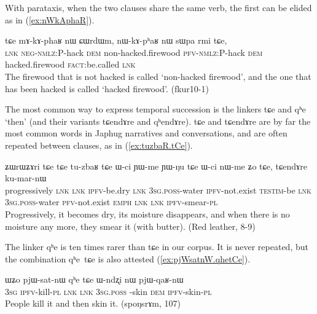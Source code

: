 \documentclass[oldfontcommands,oneside,a4paper,11pt]{article}
\newcommand{\ipa}[1]{{\phon \mbox{#1}}} %
\newcommand{\refb}[1]{(\ref{#1})}
\begin{document}
With parataxis, when the two clauses share the same verb, the first can be elided as in \refb{ex:nWkAphaR}.

\begin{exe}
\ex \label{ex:nWkAphaR}
\gll 
\ipa{tɕe}  	\ipa{mɤ-kɤ-phaʁ}  	\ipa{nɯ}  	\ipa{ɕɯrdɯm,}  	\ipa{nɯ-kɤ-pʰaʁ}  	\ipa{nɯ}  	\ipa{sɯpa}  	\ipa{rmi}  	\ipa{tɕe,}  	\\
\textsc{lnk} \textsc{neg-nmlz:}P-hack \textsc{dem} non-hacked.firewood \textsc{pfv-nmlz:}P-hack \textsc{dem} hacked.firewood \textsc{fact}:be.called \textsc{lnk} \\
\glt The firewood that is not hacked is called `non-hacked firewood', and the one that has been hacked is called `hacked firewood'. (fkur10-1)
\end{exe}

The most common way to express temporal succession is the linkers \ipa{tɕe} and \ipa{qʰe} `then' (and their variants \ipa{tɕendɤre} and \ipa{qʰendɤre}). \ipa{tɕe}   and \ipa{tɕendɤre} are by far the most common words in Japhug narratives and conversations, and are often repeated between clauses, as in \refb{ex:tuzbaR.tCe}. 

\begin{exe}
\ex \label{ex:tuzbaR.tCe}
\gll 
\ipa{ʑɯrɯʑɤri}  	\ipa{tɕe}  	\ipa{tɕe}  	\ipa{tu-zbaʁ}  	\ipa{tɕe}  	\ipa{ɯ-ci}  	\ipa{ɲɯ-me}  	\ipa{ɲɯ-ŋu}  	\ipa{tɕe}  	\ipa{ɯ-ci}  	\ipa{nɯ-me}  	\ipa{ʑo}  	\ipa{tɕe,}  	\ipa{tɕendɤre}  	\ipa{ku-mar-nɯ}  \\
progressively \textsc{lnk}  \textsc{lnk} \textsc{ipfv}-be.dry   \textsc{lnk}  \textsc{3sg.poss}-water \textsc{ipfv}-not.exist \textsc{testim}-be \textsc{lnk} \textsc{3sg.poss}-water \textsc{pfv}-not.exist \textsc{emph} \textsc{lnk}  \textsc{lnk} \textsc{ipfv}-smear-\textsc{pl} \\
\glt Progressively, it becomes dry, its moisture  disappears, and when there is no moisture any more, they smear it (with butter). (Red leather, 8-9)
\end{exe}

The linker \ipa{qʰe} is ten times rarer than \ipa{tɕe} in our corpus. It is  never repeated, but the combination \ipa{qʰe tɕe} is also attested \refb{ex:pjWsatnW.qhetCe}.

\begin{exe}
\ex \label{ex:pjWsatnW.qhetCe}
\gll 
\ipa{ɯʑo}  	\ipa{pjɯ-sat-nɯ}  	\ipa{qʰe}  	\ipa{tɕe}  	\ipa{ɯ-ndʐi}  	\ipa{nɯ}  	\ipa{pjɯ-qaʁ-nɯ}  \\
\textsc{3sg} \textsc{ipfv}-kill-\textsc{pl} \textsc{lnk}  \textsc{lnk} \textsc{3sg.poss }-skin \textsc{dem} \textsc{ipfv}-skin-\textsc{pl} \\
\glt People kill it and then skin it. (spoŋsrɤm, 107)
\end{exe}
\end{document}
